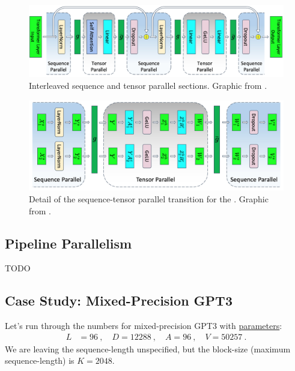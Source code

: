 \documentclass[11pt]{article}
\begin{document}
\begin{figure}[ht]
 \centering
 \includegraphics[scale=.25]{figures/transformer-tensor-sequence-parallel.jpg}
 \caption{Interleaved sequence and tensor parallel sections. Graphic from
 \cite{shoeybi2020megatronlm}. }
 \label{fig_tensor_seq_parallel}
\end{figure}

\begin{figure}[ht]
 \centering
 \includegraphics[scale=.25]{figures/mlp-tensor-sequence-parallel.jpg}
 \caption{Detail of the sequence-tensor parallel transition for the  . Graphic from
 \cite{shoeybi2020megatronlm}. }
 \label{fig_tensor_seq_parallel_detail}
\end{figure}


\subsection{Pipeline Parallelism \label{subsec_pipe_parallelism}}

TODO






\subsection{Case Study: Mixed-Precision GPT3 \label{subsec_gpt_mem_study} }

Let's run through the numbers for mixed-precision GPT3 with
\href{https://bmk.sh/2020/05/29/GPT-3-A-Brief-Summary/}{parameters}:
\begin{align}
L &= 96 \ , \quad
D = 12288 \ ,\quad
A = 96\ , \quad V = 50257\ .
 \label{eq_gpt_num}
\end{align}
We are leaving the sequence-length unspecified, but the block-size (maximum sequence-length) is $
K=2048 $.
\end{document}
